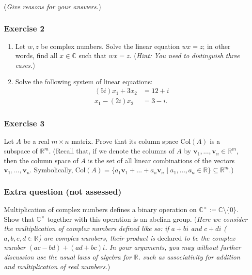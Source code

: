\documentclass[
  12pt,
  a4paper,
  twoside]{article}
\theoremstyle{plain}
\theoremstyle{definition}
\begin{document}
(\emph{Give reasons for your answers.})

\hypertarget{exercise-2}{%
\subsubsection*{Exercise 2}\label{exercise-2}}

\begin{enumerate}
\def\labelenumi{(\alph{enumi})}
\item
  Let \(w,z\) be complex numbers. Solve the linear equation \(wx=z\); in other
  words, find all \(x\in\mathbb{C}\) such that \(wx=z\). (\emph{Hint: You need to
  distinguish three cases.})
\item
  Solve the following system of linear equations: \begin{align*} (5i)x_1 +
  3x_2 &= 12+i\\ x_1 - (2i)x_2 &= 3-i. \end{align*}
\end{enumerate}

\hypertarget{exercise-3}{%
\subsubsection*{Exercise 3}\label{exercise-3}}

Let \(A\) be a real \(m\times n\) matrix. Prove that its column space \(\mathrm{Col}(A)\) is a subspace of \(\mathbb{R}^m\). (Recall that, if we denote the columns of \(A\) by \(\mathbf{v}_1,\dots,\mathbf{v}_n\in\mathbb{R}^m\), then the column space of \(A\) is the set of all linear combinations of the vectors \(\mathbf{v}_1,\dots,\mathbf{v}_n\). Symbolically, \(\mathrm{Col}(A) = \{ a_1\mathbf{v}_1+\dots+a_n\mathbf{v}_n \mid a_1,\dots,a_n\in \mathbb{R}\}\subseteq\mathbb{R}^m\).)

\hypertarget{extra-question-not-assessed}{%
\subsubsection*{Extra question (not assessed)}\label{extra-question-not-assessed}}

Multiplication of complex numbers defines a binary operation on
\(\mathbb{C}^\times := \mathbb{C}\setminus\{0\}\). Show that \(\mathbb{C}^\times\)
together with this operation is an abelian group. (\emph{Here we consider the
multiplication of complex numbers defined like so: if \(a+bi\) and \(c+di\)
(\(a,b,c,d\in\mathbb{R}\)) are complex numbers, their product is} declared \emph{to be
the complex number \((ac-bd) + (ad+bc)i\). In your arguments, you may without
further discussion use the usual laws of algebra for \(\mathbb{R}\). such as
associativity for addition and multiplication of real numbers.})
\end{document}
